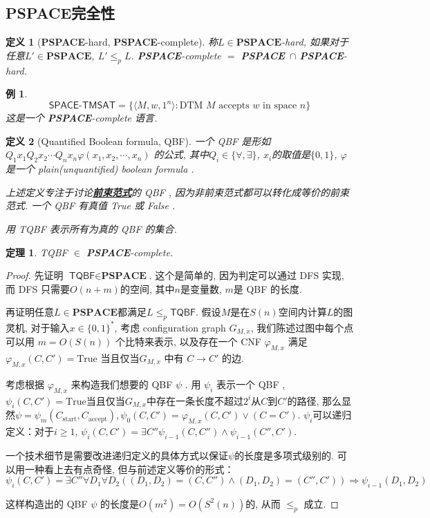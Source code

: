 \documentclass[8pt]{article}
\theoremstyle{compact}
\newtheorem{theorem}{定理}[section]
\newtheorem{definition}{定义}[section]
\newtheorem{example}{例}[section]
\def\obj#1{\textbf{\uline{#1}}}
\def\le{\leqslant}
\def\ge{\geqslant}
\def\PSPACE{\textbf{PSPACE}}
\begin{document}
\subsection{\PSPACE 完全性}
\begin{definition}[\PSPACE-hard, \PSPACE-complete]
	称$L \in \PSPACE$-hard, 如果对于任意$L' \in \PSPACE$, $L' \le_p L$. \PSPACE-complete $=$ \PSPACE\ $\cap$ \PSPACE-hard.  
\end{definition}
\begin{example}
	$$\textsf{SPACE-TMSAT} = \{ \langle M, w, 1^n \rangle : \textrm{DTM } M \textrm{ accepts } w \textrm{ in space } n \}$$
	这是一个 \PSPACE-complete 语言. 
\end{example}
\begin{definition}[Quantified Boolean formula, QBF]
	一个 QBF 是形如 $Q_1x_1Q_2x_2 \cdots Q_nx_n \varphi(x_1, x_2, \cdots, x_n)$ 的公式, 其中$Q_i \in \{\forall, \exists\}$, $x_i$的取值是$\{0, 1\}$, $\varphi$是一个 plain(unquantified) boolean formula . 

	上述定义专注于讨论\obj{前束范式}的 QBF , 因为非前束范式都可以转化成等价的前束范式. 一个 QBF 有真值 True 或 False . 

	用 \textsf{TQBF} 表示所有为真的 QBF 的集合. 
\end{definition}
\begin{theorem}
	\textsf{TQBF} $\in$ \PSPACE-complete.
	\label{TQBF}
\end{theorem}
\begin{proof}
	先证明 $\textsf{TQBF} \in \PSPACE$. 这个是简单的, 因为判定可以通过 DFS 实现, 而 DFS 只需要$O(n + m)$的空间, 其中$n$是变量数, $m$是 QBF 的长度. 

	再证明任意$L \in \PSPACE$都满足$L \le_p \textsf{TQBF}$. 假设$M$是在$S(n)$空间内计算$L$的图灵机, 对于输入$x \in \{0, 1\}^*$, 考虑 configuration graph $G_{M, x}$, 我们陈述过图中每个点可以用 $m = O(S(n))$ 个比特来表示, 以及存在一个 CNF $\varphi_{M, x}$ 满足$\varphi_{M, x}(C, C') = \textrm{True}$ 当且仅当$G_{M, x}$ 中有 $C \to C'$ 的边. 

	考虑根据 $\varphi_{M, x}$ 来构造我们想要的 QBF $\psi$ . 用 $\psi_i$ 表示一个 QBF , $\psi_i(C, C') = \textrm{True}$当且仅当$G_{M, x}$中存在一条长度不超过$2^i$从$C$到$C'$的路径, 那么显然$\psi = \psi_m(C_{\text{start}}, C_{\text{accept}}), \psi_0(C, C') = \varphi_{M, x}(C, C') \vee (C = C')$. $\psi_i$可以递归定义：对于$i \ge 1$, $\psi_i(C, C') = \exists C'' \psi_{i-1}(C, C'') \wedge \psi_{i-1}(C'', C')$. 

	一个技术细节是需要改进递归定义的具体方式以保证$\psi$的长度是多项式级别的. 可以用一种看上去有点奇怪, 但与前述定义等价的形式：
	$$\psi_i(C, C') = \exists C''\forall D_1 \forall D_2 ((D_1, D_2) = (C, C'') \wedge (D_1, D_2) = (C'', C')) \Rightarrow \psi_{i-1}(D_1, D_2)$$

	这样构造出的 QBF $\psi$ 的长度是$O(m^2) = O(S^2(n))$的, 从而 $\le_p$ 成立.
\end{proof}
\end{document}
